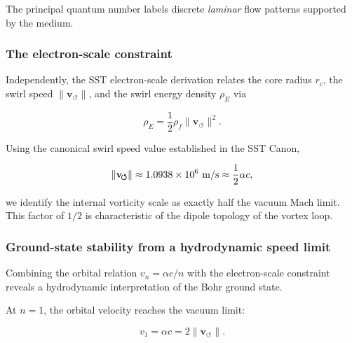         The principal quantum number labels discrete \emph{laminar} flow
        patterns supported by the medium.

    \subsubsection*{The electron-scale constraint}

        Independently, the SST electron-scale derivation relates the core radius
        $r_c$, the swirl speed $\lVert \mathbf{v}_{\!\boldsymbol{\circlearrowleft}}
\rVert$, and the swirl energy density $\rho_{\!E}$ via

        \begin{equation}
            \rho_{\!E}
            = \frac{1}{2}\rho_{\!f}
            \lVert \mathbf{v}_{\!\boldsymbol{\circlearrowleft}} \rVert^{2}.
        \end{equation}

        Using the canonical swirl speed value established in the SST Canon,

        \begin{equation}
            \lVert \mathbf{v}_{\!\boldsymbol{\circlearrowleft}}\rVert
            \approx 1.0938\times 10^{6}~{\rm m/s}
            \approx \frac{1}{2}\alpha c,
        \end{equation}

        we identify the internal vorticity scale as exactly half the vacuum Mach
        limit. This factor of $1/2$ is characteristic of the dipole topology
        of the vortex loop.

    \subsubsection*{Ground-state stability from a hydrodynamic speed limit}

        Combining the orbital relation $v_n = \alpha c / n$ with the
        electron-scale constraint reveals a hydrodynamic interpretation of the
        Bohr ground state.

        At $n=1$, the orbital velocity reaches the vacuum limit:

        \begin{equation}
            v_1 = \alpha c = 2 \lVert \mathbf{v}_{\!\boldsymbol{\circlearrowleft}}\rVert.
        \end{equation}

